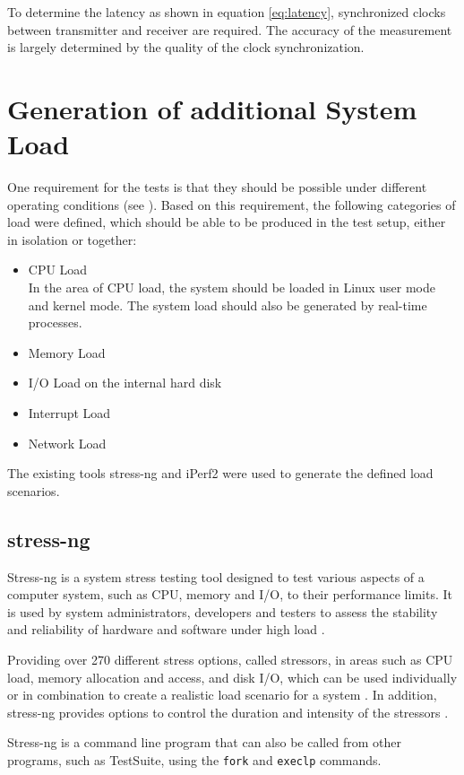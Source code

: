 To determine the latency as shown in equation \ref{eq:latency}, synchronized clocks between transmitter and receiver are required. The accuracy of the measurement is largely determined by the quality of the clock synchronization.

\section{Generation of additional System Load} \label{chap:loadgeneration}
One requirement for the tests is that they should be possible under different operating conditions (see \label{chap:introduction:research_questions}). Based on this requirement, the following categories of load were defined, which should be able to be produced in the test setup, either in isolation or together:
\begin{itemize}
	\item CPU Load \\
		In the area of CPU load, the system should be loaded in Linux user mode and kernel mode. The system load should also be generated by real-time processes.
	\item Memory Load
	\item I/O Load on the internal hard disk
	\item Interrupt Load
	\item Network Load
\end{itemize}

The existing tools stress-ng and iPerf2 were used to generate the defined load scenarios.

\subsection{stress-ng} 
Stress-ng is a  system stress testing tool designed to test various aspects of a computer system, such as CPU, memory and I/O, to their performance limits. It is used by system administrators, developers and testers to assess the stability and reliability of hardware and software under high load \cite{stress01}.

Providing over 270 different stress options, called stressors, in areas such as CPU load, memory allocation and access, and disk I/O, which can be used individually or in combination to create a realistic load scenario for a system \cite{stress02}. In addition, stress-ng provides options to control the duration and intensity of the stressors \cite{stress03}.

Stress-ng is a command line program that can also be called from other programs, such as TestSuite, using the \texttt{fork} \cite{stress04} and \texttt{execlp} \cite{stress05} commands.

